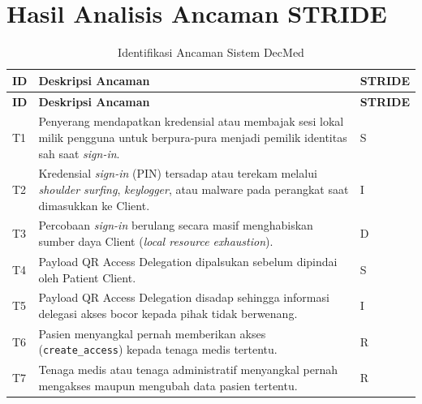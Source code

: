 \chapter{Hasil Analisis Ancaman STRIDE}

\begin{xltabular}{\textwidth}{|>{\centering\arraybackslash}p{0.8cm}|X|>{\centering\arraybackslash}p{1.8cm}|}
    \caption{Identifikasi Ancaman Sistem DecMed} 
    \label{tab:klasifikasi-ancaman} \\
    
    \hline
    \textbf{ID} & \textbf{Deskripsi Ancaman} & \textbf{STRIDE} \\
    \hline
    \endfirsthead

    \hline
    \textbf{ID} & \textbf{Deskripsi Ancaman} & \textbf{STRIDE} \\
    \hline
    \endhead

    \hline
    \endfoot

    \hline
    \endlastfoot

    T1 & Penyerang mendapatkan kredensial atau membajak sesi lokal milik pengguna untuk berpura-pura menjadi pemilik identitas sah saat \textit{sign-in}. & S \\
    \hline

    T2 & Kredensial \textit{sign-in} (PIN) tersadap atau terekam melalui \textit{shoulder surfing}, \textit{keylogger}, atau malware pada perangkat saat dimasukkan ke Client. & I \\
    \hline

    T3 & Percobaan \textit{sign-in} berulang secara masif menghabiskan sumber daya Client (\textit{local resource exhaustion}). & D \\
    \hline

    T4 & Payload QR Access Delegation dipalsukan sebelum dipindai oleh Patient Client. & S \\
    \hline

    T5 & Payload QR Access Delegation disadap sehingga informasi delegasi akses bocor kepada pihak tidak berwenang. & I \\
    \hline

    T6 & Pasien menyangkal pernah memberikan akses (\texttt{create\_access}) kepada tenaga medis tertentu. & R \\
    \hline

    T7 & Tenaga medis atau tenaga administratif menyangkal pernah mengakses maupun mengubah data pasien tertentu. & R \\
    \hline


\end{xltabular}
